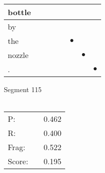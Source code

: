 \documentclass[landscape]{article}
\newcommand{\ssp}{\hspace{2pt}}
\newcommand{\mex}{\cellcolor{g}$\bullet$}
\begin{document}
\begin{tabular}{|l|p{10pt}|p{10pt}|p{10pt}|p{10pt}|p{10pt}|p{10pt}|p{10pt}|}
\hline
\ssp bottle \ssp&\hspace{2pt}&\hspace{2pt}&\hspace{2pt}&\hspace{2pt}&\hspace{2pt}&\hspace{2pt}&\hspace{2pt}\\
\hline
\ssp by \ssp&\hspace{2pt}&\hspace{2pt}&\hspace{2pt}&\hspace{2pt}&\hspace{2pt}&\hspace{2pt}&\hspace{2pt}\\
\hline
\ssp \cellcolor{ref4}the \ssp&\hspace{2pt}&\hspace{2pt}&\hspace{2pt}&\hspace{2pt}&\hspace{2pt}\mex&\hspace{2pt}&\hspace{2pt}\\
\hline
\ssp \cellcolor{ref5}nozzle \ssp&\hspace{2pt}&\hspace{2pt}&\hspace{2pt}&\hspace{2pt}&\hspace{2pt}&\hspace{2pt}\mex&\hspace{2pt}\\
\hline
\ssp \cellcolor{ref6}. \ssp&\hspace{2pt}&\hspace{2pt}&\hspace{2pt}&\hspace{2pt}&\hspace{2pt}&\hspace{2pt}&\hspace{2pt}\mex\\
\hline
\end{tabular}

\vspace{6pt}
\noindent Segment 115\\\\
\noindent\begin{tabular}{lm{12pt}r}
\hline
P:&&0.462\\
R:&&0.400\\
Frag:&&0.522\\
Score:&&0.195\\
\end{tabular}
\end{document}
